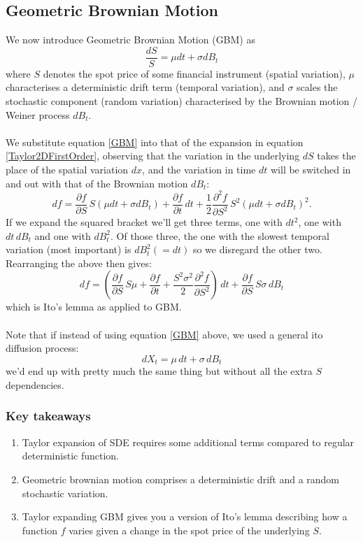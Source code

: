 \documentclass[12pt]{article}
\newcommand{\dpart}[2]{\frac{\partial #1}{\partial #2}}
\begin{document}
\subsection{Geometric Brownian Motion}
We now introduce Geometric Brownian Motion (GBM) as
\begin{equation}\label{GBM}
	\frac{dS}{S}=\mu dt+\sigma dB_t
\end{equation}
where $S$ denotes the spot price of some financial instrument (spatial variation), $\mu$ characterises a deterministic drift term (temporal variation), and $\sigma$ scales the stochastic component (random variation) characterised by the Brownian motion / Weiner process $dB_t$.\\
\\
We substitute equation \ref{GBM} into that of the expansion in equation \ref{Taylor2DFirstOrder}, observing that the variation in the underlying $dS$ takes the place of the spatial variation $dx$, and the variation in time $dt$ will be switched in and out with that of the Brownian motion $dB_t$:
\begin{equation}
	df=\dpart{f}{S}\,S\left(\mu dt+\sigma dB_t\right)+\dpart{f}{t}\,dt+\frac{1}{2}\frac{\partial^2 f}{\partial S^2}\,S^2\left(\mu dt+\sigma dB_t\right)^2.
\end{equation}
If we expand the squared bracket we'll get three terms, one with $dt^2$, one with $dt\,dB_t$ and one with $dB_t^2$. Of those three, the one with the slowest temporal variation (most important) is $dB_t^2(=dt)$ so we disregard the other two. Rearranging the above then gives:
\begin{equation}\label{ItoAppliedToGBM}
	df=\left(\dpart{f}{S}\,S\mu+\dpart{f}{t}+\frac{S^2\sigma^2}{2}\frac{\partial^2 f}{\partial S^2}\right)\,dt + \dpart{f}{S}\,S\sigma\,dB_t
\end{equation}
which is Ito's lemma as applied to GBM.\\
\\
Note that if instead of using equation \ref{GBM} above, we used a general ito diffusion process:
\begin{equation}
	dX_t=\mu\,dt+\sigma\,dB_t
\end{equation}
we'd end up with pretty much the same thing but without all the extra $S$ dependencies.
\subsubsection{Key takeaways}
\begin{enumerate}
	\item Taylor expansion of SDE requires some additional terms compared to regular deterministic function.
	\item Geometric brownian motion comprises a deterministic drift and a random stochastic variation.
	\item Taylor expanding GBM gives you a version of Ito's lemma describing how a function $f$ varies given a change in the spot price of the underlying $S$.
\end{enumerate}
\end{document}
